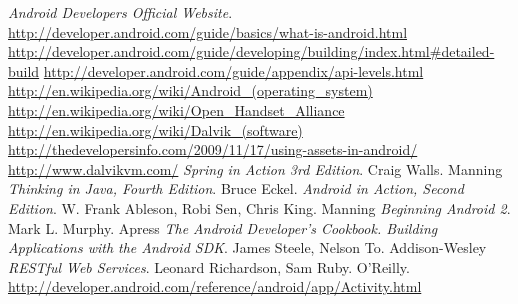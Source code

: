 \documentclass[letterpaper,12pt]{book}
\begin{document}
\begin{thebibliography}{50}
 \textit{Android Developers Official Website}.\\
  \url{http://developer.android.com/guide/basics/what-is-android.html}
  \url{http://developer.android.com/guide/developing/building/index.html#detailed-build}
  \url{http://developer.android.com/guide/appendix/api-levels.html}
  \url{http://en.wikipedia.org/wiki/Android_(operating_system)}
  \url{http://en.wikipedia.org/wiki/Open_Handset_Alliance}
  \url{http://en.wikipedia.org/wiki/Dalvik_(software)}
  \url{http://thedevelopersinfo.com/2009/11/17/using-assets-in-android/}
  \url{http://www.dalvikvm.com/}
  \textit{Spring in Action 3rd Edition}. Craig Walls. \textsf{Manning}
\textit{Thinking in Java, Fourth Edition}. Bruce Eckel.
\textit{Android in Action, Second Edition}. W. Frank Ableson, Robi Sen, Chris King. \textsf{Manning}
\textit{Beginning Android 2}. Mark L. Murphy. \textsf{Apress}
\textit{The Android Developer's Cookbook. Building Applications with the Android SDK}. James Steele, Nelson To.
\textsf{Addison-Wesley}
\textit{RESTful Web Services}. Leonard Richardson, Sam Ruby. \textsf{O'Reilly}.
\url{http://developer.android.com/reference/android/app/Activity.html} 
\end{thebibliography}
\end{document}
